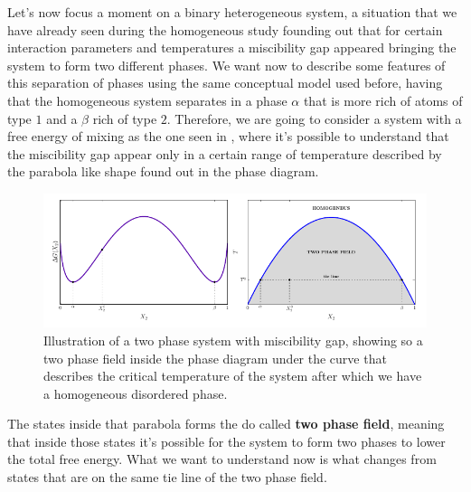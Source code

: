 Let's now focus a moment on a binary heterogeneous system, a situation that we have already seen during the homogeneous study founding out that for certain interaction parameters and temperatures a miscibility gap appeared bringing the system to form two different phases. We want now to describe some features of this separation of phases using the same conceptual model used before, having that the homogeneous system separates in a phase $\alpha$ that is more rich of atoms of type $1$ and a $\beta$ rich of type $2$. Therefore, we are going to consider a system with a free energy of mixing as the one seen in , where it's possible to understand that the miscibility gap appear only in a certain range of temperature described by the parabola like shape found out in the phase diagram.
\begin{figure}[t]
    \centering
    \includegraphics[width=\textwidth]{Immagini/TwoPhase.pdf}
    \caption
    {
        Illustration of a two phase system with miscibility gap, showing so a two phase field inside the phase diagram under the curve that describes the critical temperature of the system after which we have a homogeneous disordered phase. 
    }
    \label{fig:TwoPhase}
\end{figure}
The states inside that parabola forms the do called \textbf{two phase field}, meaning that inside those states it's possible for the system to form two phases to lower the total free energy. What we want to understand now is what changes from states that are on the same tie line of the two phase field.

